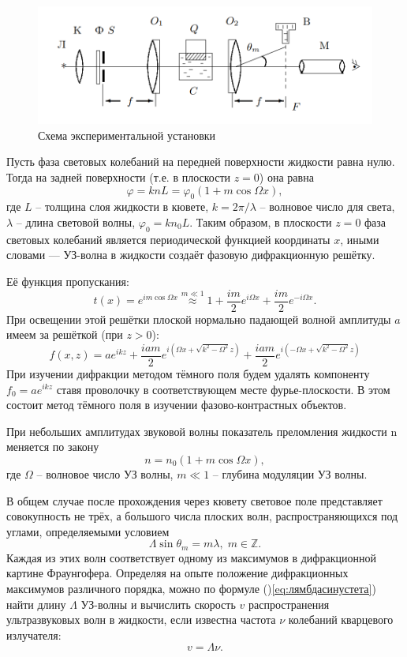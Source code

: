 \documentclass[10pt, a4paper]{article}
\begin{document}
\begin{figure}[H]
	\centering
	\includegraphics[width=1\linewidth]{Screenshot_1}
	\caption{Схема экспериментальной установки}
	\label{fig:screenshot1}
\end{figure}
Пусть фаза световых колебаний на передней поверхности жидкости равна нулю. Тогда на задней поверхности (т.е. в плоскости $ z=0 $) она равна \[\varphi = k n L = \varphi_0(1+m \cos \Omega x),\]
где $ L $ -- толщина слоя жидкости в кювете, $ k = 2 \pi /\lambda $ -- волновое число для света, $\lambda $ -- длина световой волны, $ \varphi_0 = k n_0 L $. Таким образом, в плоскости $ z=0 $ фаза световых колебаний является периодической функцией координаты $ x $, иными словами — УЗ-волна в жидкости создаёт фазовую дифракционную решётку.

Её функция пропускания:
\begin{equation}\label{eq:1}
	t(x) = e^{i m \cos \Omega x} \overset{m \ll 1}{\approx} 1 + \frac{im}{2}e^{i \Omega x} + \frac{im}{2}e^{-i \Omega x}.
\end{equation} 
При освещении этой решётки плоской нормально падающей волной амплитуды $ a $ имеем за решёткой (при $ z > 0 $):
\[f(x, z) = a e^{i k z} + \frac{i a m}{2} e^{i(\Omega x +\sqrt{k^2-\Omega^2 } z )}+\frac{i a m}{2} e^{i(-\Omega x +\sqrt{k^2-\Omega^2 } z )}\]
При изучении дифракции методом тёмного поля будем удалять компоненту $ f_0 = a e^{i k z} $ ставя проволочку в соответствующем месте фурье-плоскости. В этом состоит метод тёмного поля в изучении фазово-контрастных объектов. 

При небольших амплитудах звуковой волны показатель преломления жидкости n меняется по закону
\[n=n_0(1+m \cos \Omega x),\]
где $ \Omega $ -- волновое число УЗ волны, $ m\ll 1 $ -- глубина модуляции УЗ волны.

В общем случае после прохождения через кювету световое поле представляет совокупность не трёх, а большого числа плоских волн, распространяющихся под углами, определяемыми условием \begin{equation}\label{eq:лямбдасинустета}
	\Lambda \sin \theta_m = m \lambda, \; m\in \mathbb{Z}.
\end{equation}
Каждая из этих волн соответствует одному из максимумов в дифракционной картине Фраунгофера.
Определяя на опыте положение дифракционных максимумов различного порядка, можно по формуле ()\ref{eq:лямбдасинустета}) найти длину $ \Lambda $ УЗ-волны и вычислить скорость $ v $ распространения ультразвуковых волн в жидкости, если известна частота $ \nu $ колебаний кварцевого излучателя:
\[v = \Lambda \nu .\] 
\end{document}
